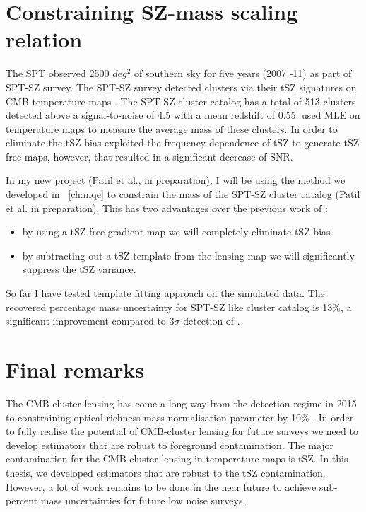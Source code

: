  
 

\section{Constraining SZ-mass scaling relation}
\label{sz_mass}
The SPT observed 2500 $deg^{2}$ of southern sky for five years (2007 -11) as part of SPT-SZ survey.
The SPT-SZ survey detected clusters via their tSZ signatures on CMB temperature maps \citep{bleem15}. The SPT-SZ cluster catalog has a total of 513 clusters detected above a signal-to-noise of 4.5 with a mean redshift of 0.55.
\citet{baxter15} used MLE on temperature maps to measure the average mass of these clusters. 
In order to eliminate the tSZ bias \citet{baxter15} exploited the frequency dependence of tSZ to generate tSZ free maps, however, that resulted in a significant decrease of SNR. 

In my new project (Patil et al., in preparation), I will be using the method we developed in  ~\ref{ch:mqe} to constrain the mass of the SPT-SZ cluster catalog (Patil et al. in preparation). This has two advantages over the previous work of \citet{baxter15}:
\begin{itemize}
\item by using a tSZ free gradient map we will completely eliminate tSZ bias
\item by subtracting out a tSZ template from the lensing map we will significantly suppress the tSZ variance. 
\end{itemize}
So far I have tested template fitting approach \citep{patil19} on the simulated data. The recovered percentage mass uncertainty for SPT-SZ like cluster catalog is 13\%, a significant improvement compared to $3\sigma$ detection of \citet{baxter15}.

\section{Final remarks}
\label{concluding_remarks}
The CMB-cluster lensing has come a long way from the detection regime in 2015 \citep{baxter15} to constraining optical richness-mass normalisation parameter by 10\% \citep{geach17}. 
In order to fully realise the potential of CMB-cluster lensing for future surveys we need to develop estimators that are robust to foreground contamination. 
The major contamination for the CMB cluster lensing in temperature maps is tSZ. 
In this thesis, we developed estimators that are robust to the tSZ contamination. %
However, a lot of work remains to be done in the near future to achieve sub-percent mass uncertainties for future low noise surveys.

